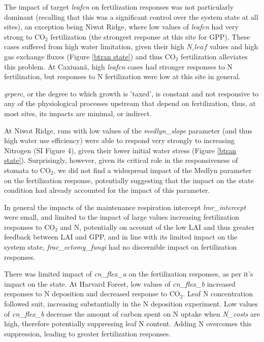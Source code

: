 \documentclass[draft,linenumbers]{agujournal}
\begin{document}
The impact of target \emph{leafcn} on fertilization responses was not particularly dominant (recalling that this was a significant control over the system state at all sites), an exception being Niwot Ridge, where low values of \emph{leafcn} had very strong to CO$_{2}$ fertilization (the strongest response at this site for GPP). These cases suffered from high water limitation, given their high $N\_{leaf}$ values and high gas exchange fluxes (Figure \ref{btran state}) and thus CO$_{2}$ fertilization alleviates this problem. At Caxiuan\~a, high \emph{leafcn} cases had stronger responses to N fertilization, but responses to N fertilization were low at this site in general.  

\emph{grperc}, or the degree to which growth is 'taxed', is constant and not responsive to any of the physiological processes upstream that depend on fertilization, thus, at most sites, its impacts are minimal, or indirect. 

At Niwot Ridge, runs with low values of the \emph{medlyn\_slope} parameter (and thus high water use efficiency) were able to respond very strongly to increasing Nitrogen (SI Figure 4), given their lower initial water stress (Figure \ref{btran state}). Surprisingly, however, given its critical role in the responsiveness of stomata to CO$_{2}$, we did not find a widespread impact of the Medlyn parameter on the fertilization response, potentially suggesting that the impact on the state condition had already accounted for the impact of this parameter. 

In general the impacts of the maintenance respiration intercept \emph{lmr\_intercept} were small, and limited to the impact of large values increasing fertilization responses to CO$_{2}$ and N, potentially on account of the low LAI and thus greater feedback between LAI and GPP, and in line with its limited impact on the system state, \emph{frac\_ectomy\_fungi} had no discernible impact on fertilization responses. 

There was limited impact of \emph{cn\_flex\_a} on the fertilization responses, as per it's impact on the state.  At Harvard Forest, low values of  \emph{cn\_flex\_b} increased responses to N deposition and decreased response to CO$_{2}$. Leaf N concentration followed suit, increasing substantially in the N deposition experiment. Low values of \emph{cn\_flex\_b} decrease the amount of carbon spent on N uptake when \emph{N\_costs} are high, therefore potentially suppressing leaf N content. Adding N overcomes this suppression, leading to greater fertilization responses.
\end{document}
